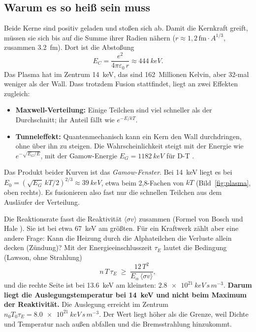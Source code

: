 \subsection{Warum es so heiß sein muss}
Beide Kerne sind positiv geladen und stoßen sich ab. Damit die Kernkraft greift, müssen sie sich bis auf die Summe ihrer
Radien nähern ($r \approx 1{,}2\,\mathrm{fm}\cdot A^{1/3}$, zusammen \SI{3,2}{fm}). Dort ist die Abstoßung
\[ E_C = \frac{e^2}{4\pi\varepsilon_0\,r} \approx \SI{444}{keV}. \]
Das Plasma hat im Zentrum \SI{14}{keV}, das sind 162~Millionen Kelvin, aber 32-mal weniger als der Wall. Dass
trotzdem Fusion stattfindet, liegt an zwei Effekten zugleich:
\begin{itemize}
\item \textbf{Maxwell-Verteilung:} Einige Teilchen sind viel schneller als der Durchschnitt; ihr Anteil fällt wie
  $e^{-E/kT}$.
\item \textbf{Tunneleffekt:} Quantenmechanisch kann ein Kern den Wall durchdringen, ohne über ihn zu steigen. Die
  Wahrscheinlichkeit steigt mit der Energie wie $e^{-\sqrt{E_G/E}}$, mit der Gamow-Energie $E_G = \SI{1182}{keV}$ für
  D-T \cite{boschhale1992}.
\end{itemize}
Das Produkt beider Kurven ist das \emph{Gamow-Fenster}. Bei \SI{14}{keV} liegt es bei
$E_0 = (\sqrt{E_G}\,kT/2)^{2/3} \approx \SI{39}{keV}$, etwa beim 2,8-Fachen von $kT$
(Bild~\ref{fig:plasma}, oben rechts). Es fusionieren also fast nur die schnellen Teilchen aus dem Ausläufer der
Verteilung.

Die Reaktionsrate fasst die Reaktivität $\langle\sigma v\rangle$ zusammen (Formel von Bosch und Hale
\cite{boschhale1992}). Sie ist bei etwa \SI{67}{keV} am größten. Für ein Kraftwerk zählt aber eine andere Frage:
Kann die Heizung durch die Alphateilchen die Verluste allein decken (Zündung)? Mit der Energieeinschlusszeit $\tau_E$
lautet die Bedingung (Lawson, ohne Strahlung)
\[ n\,T\,\tau_E \;\ge\; \frac{12\,T^2}{E_\alpha\,\langle\sigma v\rangle}, \]
und die rechte Seite ist bei \SI{13,6}{keV} am kleinsten: $\SI{2,8e21}{keV\,s\,m^{-3}}$. \textbf{Darum liegt die
Auslegungstemperatur bei \SI{14}{keV} und nicht beim Maximum der Reaktivität.} Die Auslegung erreicht im Zentrum
$n_0 T_0 \tau_E = \SI{8,0e21}{keV\,s\,m^{-3}}$. Der Wert liegt höher als die Grenze, weil Dichte und Temperatur nach
außen abfallen und die Bremsstrahlung hinzukommt.

